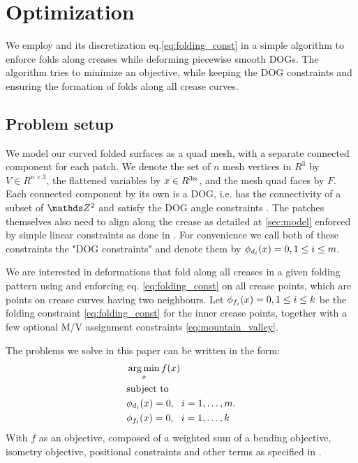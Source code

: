\section{Optimization} \label{sec:implementation}
We employ  and its discretization eq.\eqref{eq:folding_const} in a simple algorithm to enforce folds along creases while deforming piecewise smooth DOGs. The algorithm tries to minimize an objective, while keeping the DOG constraints and ensuring the formation of folds along all crease curves.

\subsection{Problem setup}
We model our curved folded surfaces as a quad mesh, with a separate connected component for each patch. We denote the set of $n$ mesh vertices in $R^3$ by $V \in R^{n\times3}$, the flattened variables by $x \in R^{3n}$, and the mesh quad faces by $F$. Each connected component by its own is a DOG, i.e. has the connectivity of a subset of $\Z^2$ and satisfy the DOG angle constraints \cite{rabi18}. The patches themselves also need to align along the crease as detailed at \ref{sec:model} enforced by simple linear constraints as done in \cite{rabi2018shape}. For convenience we call both of these constraints the "DOG constraints" and denote them by $\phi_{d_i}(x) = 0, 1 \leq i \leq m$.

We are interested in deformations that fold along all creases in a given folding pattern using  and enforcing eq. \eqref{eq:folding_const} on all crease points, which are points on crease curves having two neighbours. Let $\phi_{f_i}(x) = 0, 1 \leq i \leq k$ be the folding constraint \eqref{eq:folding_const} for the inner crease points, together with a few optional M/V assignment constraints \eqref{eq:mountain_valley}.

The problems we solve in this paper can be written in the form:
\begin{equation} \label{eq:const_opt}
\begin{aligned}
& \operatorname*{arg\,min}_x f(x) \\
& \textrm{subject to} \\
& \phi_{d_i}(x) = 0, \ \  i = 1, \ldots, m. \\
& \phi_{f_i}(x) = 0, \ \  i = 1, \ldots, k \\ 
\end{aligned}
\end{equation}
With $f$ as an objective, composed of a weighted sum of a bending objective, isometry objective, positional constraints and other terms as specified in .

